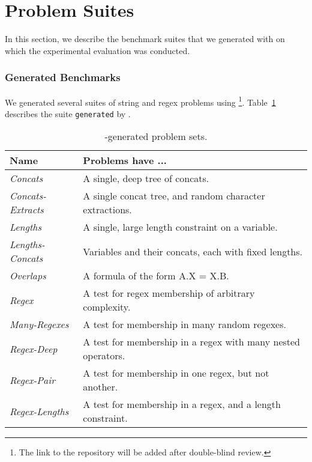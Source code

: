 \section{Problem Suites}
\label{sec:problems}

In this section, we describe the benchmark suites that we generated
with \fuzzer{} on which the experimental evaluation was conducted.

\subsubsection{Generated Benchmarks}

We generated several suites
of string and regex problems using \fuzzer{}\footnote{The link to the
repository will be added after double-blind review.}.
Table~\ref{tbl:generated} describes the suite
\texttt{generated} by \generator{}.
\begin{table}[t]
    \centering
    \caption{\generator{}-generated problem sets.}
    \label{tbl:generated}
    \begin{tabular}{|l|l|}
        \hline
        \textbf{Name}             & \textbf{Problems have ...} \\ \hline
        \textit{Concats}          & A single, deep tree of concats. \\ \hline
        \textit{Concats-Extracts} & A single concat tree, and random character extractions. \\ \hline
        \textit{Lengths}          & A single, large length constraint on a variable. \\ \hline
        \textit{Lengths-Concats}  & Variables and their concats, each with fixed lengths. \\ \hline
        \textit{Overlaps}         & A formula of the form A.X = X.B. \\ \hline
        \textit{Regex}            & A test for regex membership of arbitrary complexity. \\ \hline
        \textit{Many-Regexes}     & A test for membership in many random regexes. \\ \hline
        \textit{Regex-Deep}       & A test for membership in a regex with many nested operators. \\ \hline
        \textit{Regex-Pair}       & A test for membership in one regex, but not another. \\ \hline
        \textit{Regex-Lengths}    & A test for membership in a regex, and a length constraint. \\ \hline
    \end{tabular}
\end{table}

